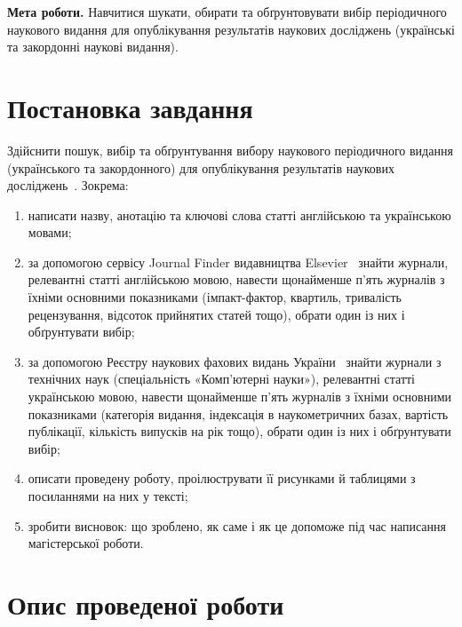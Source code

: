 \documentclass[14pt,a4paper]{extreport}
\begin{document}

\textbf{Мета роботи.} Навчитися шукати, обирати та обґрунтовувати вибір періодичного наукового видання для опублікування результатів наукових досліджень (українські та закордонні наукові видання).

\section{Постановка завдання}

Здійснити пошук, вибір та обґрунтування вибору наукового періодичного видання (українського та закордонного) для опублікування результатів наукових досліджень~\cite{guide}. Зокрема:

\begin{enumerate}
\item написати назву, анотацію та ключові слова статті англійською та українською мовами;

\item за допомогою сервісу Journal Finder видавництва Elsevier~\cite{journalfinder} знайти журнали, релевантні статті англійською мовою, навести щонайменше п'ять журналів з їхніми основними показниками (імпакт-фактор, квартиль, тривалість рецензування, відсоток прийнятих статей тощо), обрати один із них і обґрунтувати вибір;

\item за допомогою Реєстру наукових фахових видань України~\cite{nfv} знайти журнали з технічних наук (спеціальність «Комп'ютерні науки»), релевантні статті українською мовою, навести щонайменше п'ять журналів з їхніми основними показниками (категорія видання, індексація в наукометричних базах, вартість публікації, кількість випусків на рік тощо), обрати один із них і обґрунтувати вибір;

\item описати проведену роботу, проілюструвати її рисунками й таблицями з посиланнями на них у тексті;

\item зробити висновок: що зроблено, як саме і як це допоможе під час написання магістерської роботи.
\end{enumerate}

\section{Опис проведеної роботи}
\end{document}
